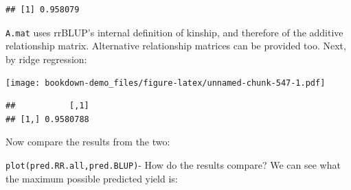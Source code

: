 \documentclass[
]{book}
\newenvironment{Shaded}{\begin{snugshade}}{\end{snugshade}}
\newcommand{\AttributeTok}[1]{\textcolor[rgb]{0.77,0.63,0.00}{#1}}
\newcommand{\ConstantTok}[1]{\textcolor[rgb]{0.00,0.00,0.00}{#1}}
\newcommand{\DecValTok}[1]{\textcolor[rgb]{0.00,0.00,0.81}{#1}}
\newcommand{\FloatTok}[1]{\textcolor[rgb]{0.00,0.00,0.81}{#1}}
\newcommand{\FunctionTok}[1]{\textcolor[rgb]{0.00,0.00,0.00}{#1}}
\newcommand{\NormalTok}[1]{#1}
\newcommand{\OtherTok}[1]{\textcolor[rgb]{0.56,0.35,0.01}{#1}}
\newcommand{\SpecialCharTok}[1]{\textcolor[rgb]{0.00,0.00,0.00}{#1}}
\newcommand{\StringTok}[1]{\textcolor[rgb]{0.31,0.60,0.02}{#1}}
\begin{document}
\begin{verbatim}
## [1] 0.958079
\end{verbatim}

\texttt{A.mat} uses rrBLUP's internal definition of kinship, and therefore of the additive relationship matrix. Alternative relationship matrices can be provided too. Next, by ridge regression:

\begin{Shaded}
\end{Shaded}

\texttt{[image: bookdown-demo\_files/figure-latex/unnamed-chunk-547-1.pdf]}

\begin{Shaded}
\end{Shaded}

\begin{verbatim}
##           [,1]
## [1,] 0.9580788
\end{verbatim}

Now compare the results from the two:

\texttt{plot(pred.RR.all,pred.BLUP)}- How do the results compare? We can see what the maximum possible predicted yield is:

\begin{Shaded}
\end{Shaded}
\end{document}
